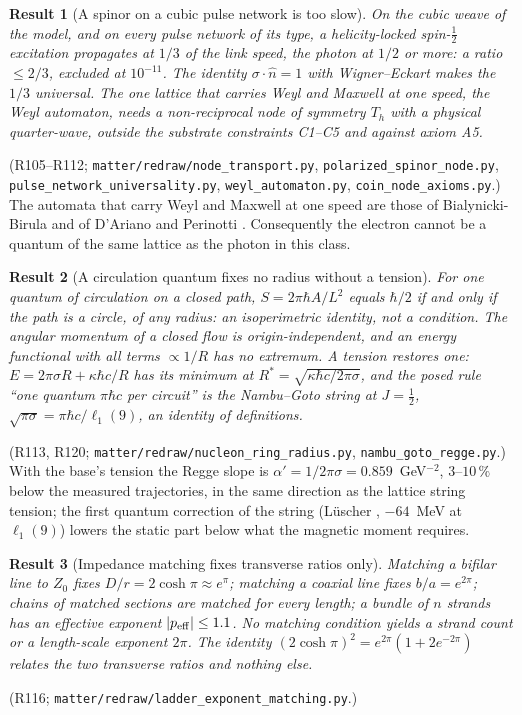 \documentclass[11pt,a4paper]{article}
\newtheorem{prop}{Result}
\newcommand{\lone}{\ensuremath{\ell_1}}
\begin{document}
\begin{prop}[A spinor on a cubic pulse network is too slow]
On the cubic weave of the model, and on every pulse network of its type, a helicity-locked spin-$\tfrac12$ excitation propagates at $1/3$ of the link speed, the photon at $1/2$ or more: a ratio $\le 2/3$, excluded at $10^{-11}$. The identity $\sigma\cdot\hat n = 1$ with Wigner--Eckart makes the $1/3$ universal. The one lattice that carries Weyl and Maxwell at one speed, the Weyl automaton, needs a non-reciprocal node of symmetry $T_h$ with a physical quarter-wave, outside the substrate constraints C1--C5 and against axiom A5.
\end{prop}
\noindent(R105--R112; \texttt{matter/redraw/node\_transport.py}, \texttt{polarized\_spinor\_node.py}, \texttt{pulse\_network\_universality.py}, \texttt{weyl\_automaton.py}, \texttt{coin\_node\_axioms.py}.) The automata that carry Weyl and Maxwell at one speed are those of Bialynicki-Birula \cite{bialynicki1994} and of D'Ariano and Perinotti \cite{dariano2014}. Consequently the electron cannot be a quantum of the same lattice as the photon in this class.

\begin{prop}[A circulation quantum fixes no radius without a tension]
For one quantum of circulation on a closed path, $S = 2\pi\hbar A/L^2$ equals $\hbar/2$ if and only if the path is a circle, of any radius: an isoperimetric identity, not a condition. The angular momentum of a closed flow is origin-independent, and an energy functional with all terms $\propto 1/R$ has no extremum. A tension restores one: $E = 2\pi\sigma R + \kappa\hbar c/R$ has its minimum at $R^* = \sqrt{\kappa\hbar c/2\pi\sigma}$, and the posed rule ``one quantum $\pi\hbar c$ per circuit'' is the Nambu--Goto string at $J = \tfrac12$, $\sqrt{\pi\sigma} = \pi\hbar c/\lone(9)$, an identity of definitions.
\end{prop}
\noindent(R113, R120; \texttt{matter/redraw/nucleon\_ring\_radius.py}, \texttt{nambu\_goto\_regge.py}.) With the base's tension the Regge slope is $\alpha' = 1/2\pi\sigma = 0.859$~GeV$^{-2}$, $3$--$10\,\%$ below the measured trajectories, in the same direction as the lattice string tension; the first quantum correction of the string (L\"uscher \cite{luscher1981}, $-64$~MeV at $\lone(9)$) lowers the static part below what the magnetic moment requires.

\begin{prop}[Impedance matching fixes transverse ratios only]
Matching a bifilar line to $Z_0$ fixes $D/r = 2\cosh\pi \approx e^\pi$; matching a coaxial line fixes $b/a = e^{2\pi}$; chains of matched sections are matched for every length; a bundle of $n$ strands has an effective exponent $|p_{\rm eff}| \le 1.1$. No matching condition yields a strand count or a length-scale exponent $2\pi$. The identity $(2\cosh\pi)^2 = e^{2\pi}(1 + 2e^{-2\pi})$ relates the two transverse ratios and nothing else.
\end{prop}
\noindent(R116; \texttt{matter/redraw/ladder\_exponent\_matching.py}.)
\end{document}
